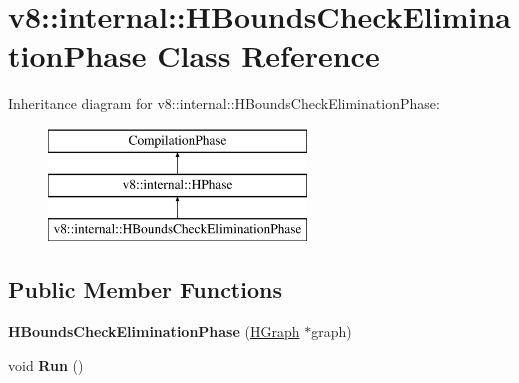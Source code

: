 \hypertarget{classv8_1_1internal_1_1_h_bounds_check_elimination_phase}{}\section{v8\+:\+:internal\+:\+:H\+Bounds\+Check\+Elimination\+Phase Class Reference}
\label{classv8_1_1internal_1_1_h_bounds_check_elimination_phase}
Inheritance diagram for v8\+:\+:internal\+:\+:H\+Bounds\+Check\+Elimination\+Phase\+:\begin{figure}[H]
\begin{center}
\leavevmode
\includegraphics[height=3.000000cm]{classv8_1_1internal_1_1_h_bounds_check_elimination_phase}
\end{center}
\end{figure}
\subsection*{Public Member Functions}
\begin{DoxyCompactItemize}
\item 
{\bfseries H\+Bounds\+Check\+Elimination\+Phase} (\hyperlink{classv8_1_1internal_1_1_h_graph}{H\+Graph} $\ast$graph)\hypertarget{classv8_1_1internal_1_1_h_bounds_check_elimination_phase_aa43024e96cb37ceaefe177bf2fa892d1}{}\label{classv8_1_1internal_1_1_h_bounds_check_elimination_phase_aa43024e96cb37ceaefe177bf2fa892d1}

\item 
void {\bfseries Run} ()\hypertarget{classv8_1_1internal_1_1_h_bounds_check_elimination_phase_a9ffb33e5008a03fd456110ff184d722c}{}\label{classv8_1_1internal_1_1_h_bounds_check_elimination_phase_a9ffb33e5008a03fd456110ff184d722c}

\end{DoxyCompactItemize}
